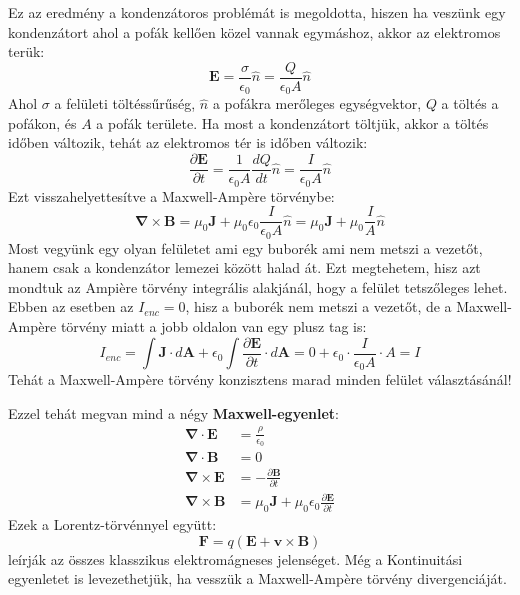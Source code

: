 \documentclass[../main.tex]{subfiles}
\begin{document}
Ez az eredmény a kondenzátoros problémát is megoldotta, hiszen ha veszünk egy kondenzátort ahol a pofák kellően közel vannak egymáshoz, akkor az elektromos terük:
\begin{equation}
    \mathbf{E} = \frac{\sigma}{\epsilon_0} \hat{n} = \frac{Q}{\epsilon_0 A} \hat{n}
\end{equation}
Ahol $\sigma$ a felületi töltéssűrűség, $\hat{n}$ a pofákra merőleges egységvektor, $Q$ a töltés a pofákon, és $A$ a pofák területe. Ha most a kondenzátort töltjük, akkor a töltés időben változik, tehát az elektromos tér is időben változik:
\begin{equation}
    \frac{\partial \mathbf{E}}{\partial t} = \frac{1}{\epsilon_0 A} \frac{dQ}{dt} \hat{n} = \frac{I}{\epsilon_0 A} \hat{n}
\end{equation}
Ezt visszahelyettesítve a Maxwell-Ampère törvénybe:
\begin{equation}
    \boldsymbol{\nabla} \times \mathbf{B} = \mu_0 \mathbf{J} + \mu_0 \epsilon_0 \frac{I}{\epsilon_0 A} \hat{n} = \mu_0 \mathbf{J} + \mu_0 \frac{I}{A} \hat{n}
\end{equation}
Most vegyünk egy olyan felületet ami egy buborék ami nem metszi a vezetőt, hanem csak a kondenzátor lemezei között halad át. Ezt megtehetem,
hisz azt mondtuk az Ampière törvény integrális alakjánál, hogy a felület tetszőleges lehet. Ebben az esetben az $I_{enc} = 0$, hisz a buborék nem metszi a vezetőt, de a Maxwell-Ampère törvény miatt a jobb oldalon van egy plusz tag is:
\begin{equation}
    I_{enc} = \int \mathbf{J} \cdot d\mathbf{A} + \epsilon_0 \int \frac{\partial \mathbf{E}}{\partial t} \cdot d\mathbf{A} = 0 + \epsilon_0 \cdot \frac{I}{\epsilon_0 A} \cdot A = I
\end{equation}
Tehát a Maxwell-Ampère törvény konzisztens marad minden felület választásánál!

Ezzel tehát megvan mind a négy \textbf{Maxwell-egyenlet}:
\begin{equation}
    \boxed{\begin{aligned}
        \boldsymbol{\nabla} \cdot \mathbf{E} &= \frac{\rho}{\epsilon_0} \\
        \boldsymbol{\nabla} \cdot \mathbf{B} &= 0 \\
        \boldsymbol{\nabla} \times \mathbf{E} &= - \frac{\partial \mathbf{B}}{\partial t} \\
        \boldsymbol{\nabla} \times \mathbf{B} &= \mu_0 \mathbf{J} + \mu_0 \epsilon_0 \frac{\partial \mathbf{E}}{\partial t}
    \end{aligned}}
\end{equation}
Ezek a Lorentz-törvénnyel együtt:
\begin{equation}
    \mathbf{F} = q(\mathbf{E} + \mathbf{v} \times \mathbf{B})
\end{equation}
leírják az összes klasszikus elektromágneses jelenséget. Még a Kontinuitási egyenletet is levezethetjük, ha vesszük a Maxwell-Ampère törvény divergenciáját.
\end{document}
